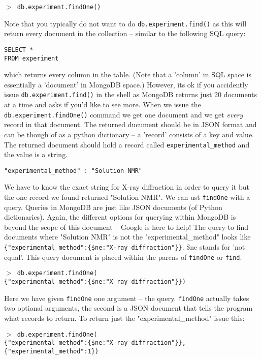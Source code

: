 \documentclass[12pt]{article}
\newcommand{\mdbcmdline}[1]{\vspace{5mm} \noindent
\texttt{$>$ #1}
\vspace{5mm}

}
\begin{document}
\mdbcmdline{db.experiment.findOne()}
\noindent
Note that you typically do not want to do \texttt{db.experiment.find()} as this will return every document in the collection -- similar to the following SQL query:

\vspace{5mm}
\noindent
\texttt{SELECT *\\
FROM experiment}

\vspace{5mm}
\noindent
which returns every column in the table. 
(Note that a 'column' in SQL space is essentially a 'document' in MongoDB space.)
However, its ok if you accidently issue \texttt{db.experiment.find()} in the shell as MongoDB returns just 20 documents at a time and asks if you'd like to see more.
When we issue the \texttt{db.experiment.findOne()} command we get one document and we get \textit{every} record in that document.
The returned ducument should be in JSON format and can be though of as a python dictionary -- a 'record' consists of a key and value.
The returned document should hold a record called \texttt{experimental\_method} and the value is a string.

\vspace{5mm}
\noindent
\texttt{"experimental\_method" : "Solution NMR"}

\vspace{5mm}
\noindent
We have to know the exact string for X-ray diffraction in order to query it but the one record we found returned "Solution NMR".
We can ust \texttt{findOne} with a query.
Queries in MongoDB are just like JSON documents (of Python dictionaries).
Again, the different options for querying within MongoDB is beyond the scope of this document -- Google is here to help!
The query to find documents where "Solution NMR" is not the "experimental\_method" looks like \texttt{\{"experimental\_method":\{\$ne:"X-ray diffraction"\}\}}. \$ne stands for 'not equal'.
This query document is placed within the parens of \texttt{findOne} or \texttt{find}.

\mdbcmdline{db.experiment.findOne(\\
\{"experimental\_method":\{\$ne:"X-ray diffraction"\}\})}
\noindent
Here we have given \texttt{findOne} one argument -- the query. 
\texttt{findOne} actually takes two optional arguments, the second is a JSON document that tells the program what records to return.
To return just the "experimental\_method" issue this:

\mdbcmdline{db.experiment.findOne(\\
\{"experimental\_method":\{\$ne:"X-ray diffraction"\}\}, \\
\{"experimental\_method":1\})
}
\end{document}
